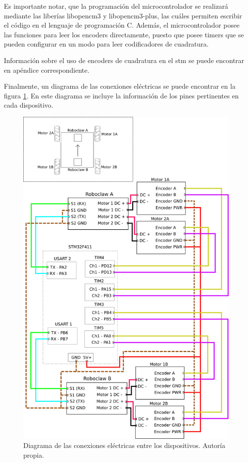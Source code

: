 Es importante notar, que la programación del microcontrolador se realizará mediante las liberías libopencm3 y libopencm3-plus, las cuáles permiten escribir el código en el lenguaje de programación C. Además, el microcontrolador posee las funciones para leer los encoders directamente, puesto que posee timers que se pueden configurar en un modo para leer codificadores de cuadratura.

Información sobre el uso de encoders de cuadratura en el stm se puede encontrar en apéndice correspondiente.

Finalmente, un diagrama de las conexiones eléctricas se puede encontrar en la figura \ref{F:conexiones}. En este diagrama se incluye la información de los pines pertinentes en cada dispositivo.

\begin{figure}[H]
\centering
\includegraphics[scale=0.63]{imagenes/diagrama_electrico.png}
\caption{Diagrama de las conexiones eléctricas entre los dispositivos. Autoría propia.}
\label{F:conexiones}
\end{figure}

